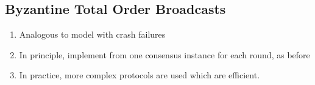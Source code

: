 \documentclass{article}
\begin{document}
\begin{adjustwidth}{2em}{2em}
		\subsection{Byzantine Total Order Broadcasts}
		\begin{adjustwidth}{2em}{2em}
			\begin{enumerate}[-]
				\item Analogous to model with crash failures
				\item In principle, implement from one consensus instance for each round, as before
				\item In practice, more complex protocols are used which are efficient.
			\end{enumerate}
		\end{adjustwidth}
	\end{adjustwidth}
	
	\newpage
	
\end{document}
